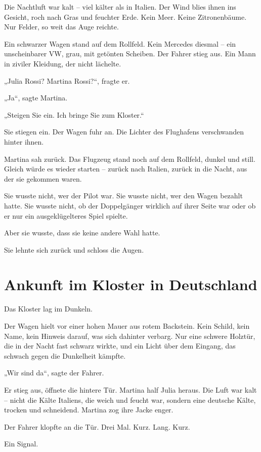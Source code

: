 \documentclass[
]{article}
\begin{document}
Die Nachtluft war kalt -- viel kälter als in Italien. Der Wind blies ihnen ins Gesicht, roch nach Gras und feuchter Erde. Kein Meer. Keine Zitronenbäume. Nur Felder, so weit das Auge reichte.

Ein schwarzer Wagen stand auf dem Rollfeld. Kein Mercedes diesmal -- ein unscheinbarer VW, grau, mit getönten Scheiben. Der Fahrer stieg aus. Ein Mann in ziviler Kleidung, der nicht lächelte.

„Julia Rossi? Martina Rossi?{\kern0pt}``, fragte er.

„Ja``, sagte Martina.

„Steigen Sie ein. Ich bringe Sie zum Kloster.``

Sie stiegen ein. Der Wagen fuhr an. Die Lichter des Flughafens verschwanden hinter ihnen.

Martina sah zurück. Das Flugzeug stand noch auf dem Rollfeld, dunkel und still. Gleich würde es wieder starten -- zurück nach Italien, zurück in die Nacht, aus der sie gekommen waren.

Sie wusste nicht, wer der Pilot war. Sie wusste nicht, wer den Wagen bezahlt hatte. Sie wusste nicht, ob der Doppelgänger wirklich auf ihrer Seite war oder ob er nur ein ausgeklügelteres Spiel spielte.

Aber sie wusste, dass sie keine andere Wahl hatte.

Sie lehnte sich zurück und schloss die Augen.

\section{Ankunft im Kloster in Deutschland}\label{ankunft-im-kloster-in-deutschland}

Das Kloster lag im Dunkeln.

Der Wagen hielt vor einer hohen Mauer aus rotem Backstein. Kein Schild, kein Name, kein Hinweis darauf, was sich dahinter verbarg. Nur eine schwere Holztür, die in der Nacht fast schwarz wirkte, und ein Licht über dem Eingang, das schwach gegen die Dunkelheit kämpfte.

„Wir sind da``, sagte der Fahrer.

Er stieg aus, öffnete die hintere Tür. Martina half Julia heraus. Die Luft war kalt -- nicht die Kälte Italiens, die weich und feucht war, sondern eine deutsche Kälte, trocken und schneidend. Martina zog ihre Jacke enger.

Der Fahrer klopfte an die Tür. Drei Mal. Kurz. Lang. Kurz.

Ein Signal.
\end{document}
